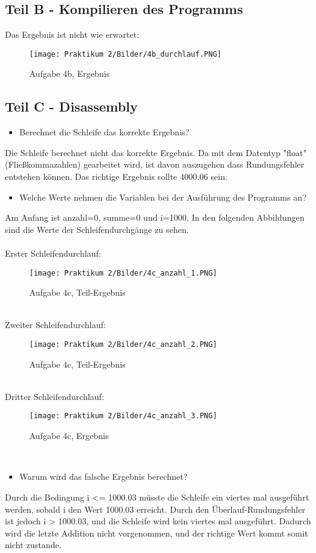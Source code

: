 \documentclass[12pt]{article}
\begin{document}
\subsection{Teil B - Kompilieren des Programms}

Das Ergebnis ist nicht wie erwartet:

\begin{figure}[htbp]
    \centering
    \texttt{[image: Praktikum 2/Bilder/4b\_durchlauf.PNG]}
    \caption{Aufgabe 4b, Ergebnis}
\end{figure}
\newpage

\subsection{Teil C - Disassembly}

\begin{itemize}
  \item Berechnet die Schleife das korrekte Ergebnis?
\end{itemize}
Die Schleife berechnet nicht das korrekte Ergebnis. Da mit dem Datentyp "float" (Fließkommazahlen) gearbeitet wird, ist davon auszugehen dass Rundungsfehler entstehen können. Das richtige Ergebnis sollte 4000.06 sein.

\begin{itemize}
  \item Welche Werte nehmen die Variablen bei der Ausführung des Programms an?
\end{itemize}
Am Anfang ist anzahl=0, summe=0 und i=1000. In den folgenden Abbildungen sind die Werte der Schleifendurchgänge zu sehen.\\\\
Erster Schleifendurchlauf:
\begin{figure}[htbp]
    \centering
    \texttt{[image: Praktikum 2/Bilder/4c\_anzahl\_1.PNG]}
    \caption{Aufgabe 4c, Teil-Ergebnis}
\end{figure}
\\
Zweiter Schleifendurchlauf:
\begin{figure}[htbp]
    \centering
    \texttt{[image: Praktikum 2/Bilder/4c\_anzahl\_2.PNG]}
    \caption{Aufgabe 4c, Teil-Ergebnis}
\end{figure}
\\
Dritter Schleifendurchlauf:
\begin{figure}[htbp]
    \centering
    \texttt{[image: Praktikum 2/Bilder/4c\_anzahl\_3.PNG]}
    \caption{Aufgabe 4c, Ergebnis}
\end{figure}
\\
\begin{itemize}
  \item Warum wird das falsche Ergebnis berechnet?
\end{itemize}
Durch die Bedingung i <= 1000.03 müsste die Schleife ein viertes mal ausgeführt werden, sobald i den Wert 1000.03 erreicht. Durch den Überlauf-Rundungsfehler ist jedoch i > 1000.03, und die Schleife wird kein viertes mal ausgeführt. Dadurch wird die letzte Addition nicht vorgenommen, und der richtige Wert kommt somit nicht zustande.
\newpage
\end{document}
